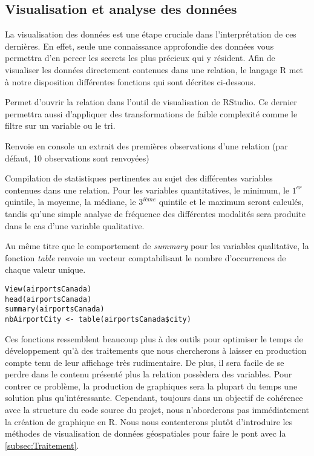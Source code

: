 \subsection{Visualisation et analyse des données}
\label{subsec:Visualisation}

La visualisation des données est une étape cruciale dans l’interprétation de ces dernières. En effet, seule une connaissance approfondie des données vous permettra d'en percer les secrets les plus précieux qui y résident. Afin de visualiser les données directement contenues dans une relation, le langage R met à notre disposition différentes fonctions qui sont décrites ci-dessous. 

\begin{description}[style=multiline,leftmargin=2cm]
		\item[\emph{View}] Permet d'ouvrir la relation dans l'outil de visualisation de RStudio. Ce dernier permettra aussi d'appliquer des transformations de faible complexité comme le filtre sur un variable ou le tri. \cite{Rfunction:View}
		\item[\emph{head}] Renvoie en console un extrait des premières observations d'une relation (par défaut, 10 observations sont renvoyées)
		\item[\emph{summary}] Compilation de statistiques pertinentes au sujet des différentes variables contenues dans une relation. Pour les variables quantitatives, le minimum, le $1^{er}$ quintile, la moyenne, la médiane, le $3^{ième}$ quintile et le maximum seront calculés, tandis qu'une simple analyse de fréquence des différentes modalités sera produite dans le cas d'une variable qualitative.
		\item[\emph{table}] Au même titre que le comportement de \emph{summary} pour les variables qualitative, la fonction \emph{table} renvoie un vecteur comptabilisant le nombre d'occurrences de chaque valeur unique.
\end{description}

\begin{lstlisting}[caption = Fonctions de visualisation de données,label=src:DataVisual]
View(airportsCanada)
head(airportsCanada)
summary(airportsCanada)
nbAirportCity <- table(airportsCanada$city) 
\end{lstlisting}

\noindent
Ces fonctions ressemblent beaucoup plus à des outils pour optimiser le temps de développement qu'à des traitements que nous chercherons à laisser en production compte tenu de leur affichage très rudimentaire. De plus, il sera facile de se perdre dans le contenu présenté plus la relation possèdera des variables. Pour contrer ce problème, la production de graphiques sera la plupart du temps une solution plus qu'intéressante. Cependant, toujours dans un objectif de cohérence avec la structure du code source du projet, nous n'aborderons pas immédiatement la création de graphique en R. Nous nous contenterons plutôt d'introduire les méthodes de visualisation de données géospatiales pour faire le pont avec la \autoref{subsec:Traitement}.\\

